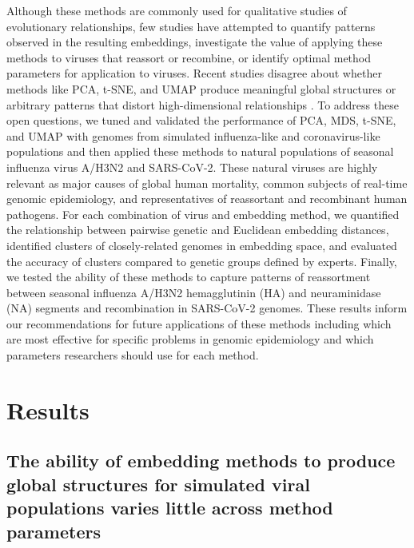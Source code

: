 \documentclass[10pt,letterpaper]{article}
\begin{document}
Although these methods are commonly used for qualitative studies of evolutionary relationships, few studies have attempted to quantify patterns observed in the resulting embeddings, investigate the value of applying these methods to viruses that reassort or recombine, or identify optimal method parameters for application to viruses.
Recent studies disagree about whether methods like PCA, t-SNE, and UMAP produce meaningful global structures \cite{kobak_2021} or arbitrary patterns that distort high-dimensional relationships \cite{Chari2023}.
To address these open questions, we tuned and validated the performance of PCA, MDS, t-SNE, and UMAP with genomes from simulated influenza-like and coronavirus-like populations and then applied these methods to natural populations of seasonal influenza virus A/H3N2 and SARS-CoV-2.
These natural viruses are highly relevant as major causes of global human mortality, common subjects of real-time genomic epidemiology, and representatives of reassortant and recombinant human pathogens.
For each combination of virus and embedding method, we quantified the relationship between pairwise genetic and Euclidean embedding distances, identified clusters of closely-related genomes in embedding space, and evaluated the accuracy of clusters compared to genetic groups defined by experts.
Finally, we tested the ability of these methods to capture patterns of reassortment between seasonal influenza A/H3N2 hemagglutinin (HA) and neuraminidase (NA) segments and recombination in SARS-CoV-2 genomes.
These results inform our recommendations for future applications of these methods including which are most effective for specific problems in genomic epidemiology and which parameters researchers should use for each method.

\section*{Results}

\subsection*{The ability of embedding methods to produce global structures for simulated viral populations varies little across method parameters}
\end{document}

